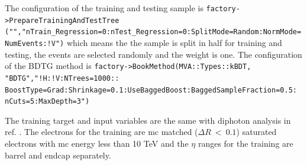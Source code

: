 The configuration of the training and testing sample is \texttt{factory->PrepareTrainingAndTestTree\\("","nTrain\_Regression=0:nTest\_Regression=0:SplitMode=Random:NormMode=\\NumEvents:!V")} which means the the sample is split in half for training and testing, the events are selected randomly and the weight is one.
The configuration of the BDTG method is \texttt{factory->BookMethod(MVA::Types::kBDT, "BDTG","!H:!V:NTrees=1000::\\BoostType=Grad:Shrinkage=0.1:UseBaggedBoost:BaggedSampleFraction=0.5:\\nCuts=5:MaxDepth=3")}

The training target and input variables are the same with diphoton analysis in ref. \cite{CMS_AN_2015-241}. The electrons for the training are mc matched ($\Delta R ~<~0.1$) saturated electrons with mc energy less than 10 TeV and the $\eta$ ranges for the training are barrel and endcap separately.

